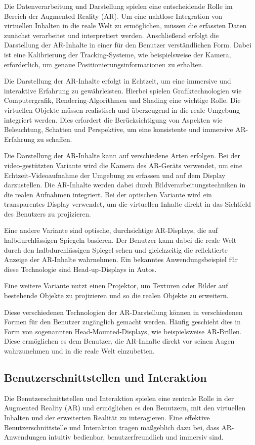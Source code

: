 Die Datenverarbeitung und Darstellung spielen eine entscheidende Rolle im
Bereich der Augmented Reality (AR). Um eine nahtlose Integration von virtuellen
Inhalten in die reale Welt zu ermöglichen, müssen die erfassten Daten zunächst
verarbeitet und interpretiert werden. Anschließend erfolgt die Darstellung der
AR-Inhalte in einer für den Benutzer verständlichen Form. Dabei ist eine
Kalibrierung der Tracking-Systeme, wie beispielsweise der Kamera, erforderlich,
um genaue Positionierungsinformationen zu erhalten.

Die Darstellung der AR-Inhalte erfolgt in Echtzeit, um eine immersive und
interaktive Erfahrung zu gewährleisten. Hierbei spielen Grafiktechnologien wie
Computergrafik, Rendering-Algorithmen und Shading eine wichtige Rolle. Die
virtuellen Objekte müssen realistisch und überzeugend in die reale Umgebung
integriert werden. Dies erfordert die Berücksichtigung von Aspekten wie
Beleuchtung, Schatten und Perspektive, um eine konsistente und immersive
AR-Erfahrung zu schaffen.

Die Darstellung der AR-Inhalte kann auf verschiedene Arten erfolgen. Bei der
video-gestützten Variante wird die Kamera des AR-Geräts verwendet, um eine
Echtzeit-Videoaufnahme der Umgebung zu erfassen und auf dem Display
darzustellen. Die AR-Inhalte werden dabei durch Bildverarbeitungstechniken in
die realen Aufnahmen integriert. Bei der optischen Variante wird ein
transparentes Display verwendet, um die virtuellen Inhalte direkt in das
Sichtfeld des Benutzers zu projizieren.

Eine andere Variante sind optische, durchsichtige AR-Displays, die auf
halbdurchlässigen Spiegeln basieren. Der Benutzer kann dabei die reale Welt
durch den halbdurchlässigen Spiegel sehen und gleichzeitig die reflektierte
Anzeige der AR-Inhalte wahrnehmen. Ein bekanntes Anwendungsbeispiel für diese
Technologie sind Head-up-Displays in Autos.

Eine weitere Variante nutzt einen Projektor, um Texturen oder Bilder auf
bestehende Objekte zu projizieren und so die realen Objekte zu erweitern.

Diese verschiedenen Technologien der AR-Darstellung können in verschiedenen
Formen für den Benutzer zugänglich gemacht werden. Häufig geschieht dies in
Form von sogenannten Head-Mounted-Displays, wie beispielsweise AR-Brillen.
Diese ermöglichen es dem Benutzer, die AR-Inhalte direkt vor seinen Augen
wahrzunehmen und in die reale Welt einzubetten.

\subsection{Benutzerschnittstellen und Interaktion}
Die Benutzerschnittstellen und Interaktion spielen eine zentrale Rolle in der
Augmented Reality (AR) und ermöglichen es den Benutzern, mit den virtuellen
Inhalten und der erweiterten Realität zu interagieren. Eine effektive
Benutzerschnittstelle und Interaktion tragen maßgeblich dazu bei, dass
AR-Anwendungen intuitiv bedienbar, benutzerfreundlich und immersiv sind.

